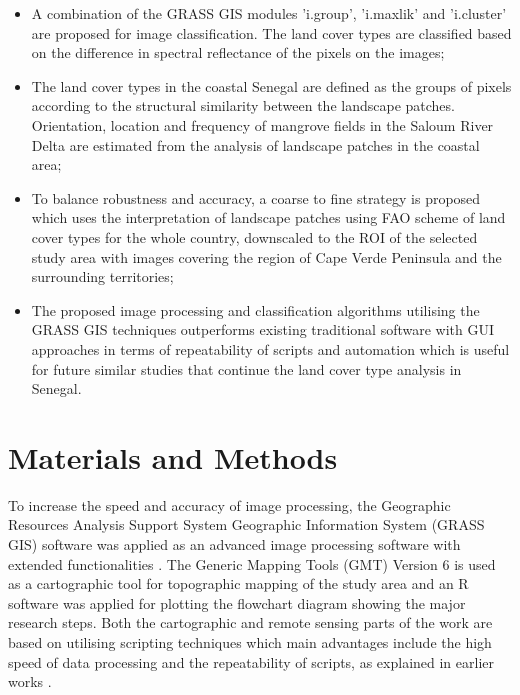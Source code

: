 \documentclass[land,article,submit,pdftex,moreauthors]{Definitions/mdpi}
\begin{document}
\begin{itemize}
  \item A combination of the GRASS GIS modules 'i.group', 'i.maxlik' and 'i.cluster' are proposed for image classification. The land cover types are classified based on the difference in spectral reflectance of the pixels on the images;
  \item The land cover types in the coastal Senegal are defined as the groups of pixels according to the structural similarity between the landscape patches. Orientation, location and frequency of mangrove fields in the Saloum River Delta are estimated from the analysis of landscape patches in the coastal area;
  \item To balance robustness and accuracy, a coarse to fine strategy is proposed which uses the interpretation of landscape patches using FAO scheme of land cover types for the whole country, downscaled to the ROI of the selected study area with images covering the region of Cape Verde Peninsula and the surrounding territories;
  \item The proposed image processing and classification algorithms utilising the GRASS GIS techniques outperforms existing traditional software with GUI approaches in terms of repeatability of scripts and automation which is useful for future similar studies that continue the land cover type analysis in Senegal.
\end{itemize}

\section{Materials and Methods}

To increase the speed and accuracy of image processing, the Geographic Resources Analysis Support System Geographic Information System (GRASS GIS) software was applied as an advanced image processing software with extended functionalities \cite{Neteleretal2008}. The Generic Mapping Tools (GMT) Version 6 \cite{Wessel} is used as a cartographic tool for topographic mapping of the study area and an R software was applied for plotting the flowchart diagram showing the major research steps.  Both the cartographic and remote sensing parts of the work are based on utilising scripting techniques which main advantages include the high speed of data processing and the repeatability of scripts, as explained in earlier works \cite{min13050604,Lemenkova202213,Lemenkova202206}.

\end{document}
